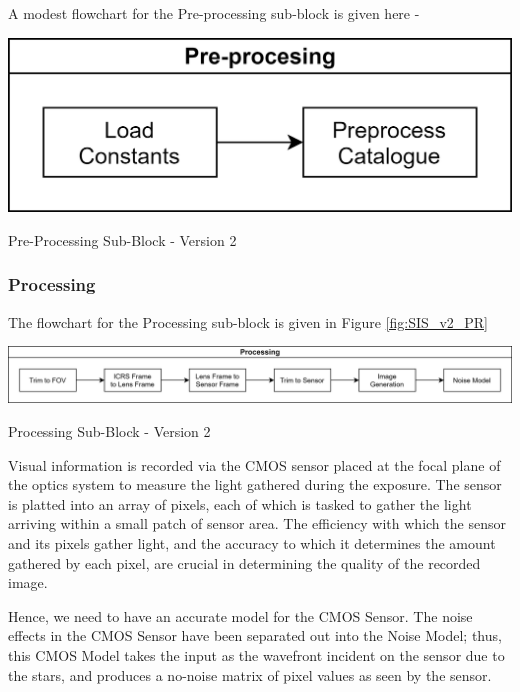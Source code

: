 A modest flowchart for the Pre-processing sub-block is given here -

\begin{Flowchart}[h!]
    \centering
    \includegraphics[scale=0.09]{Figures/Model/Pre-processing.png}
    \caption{Pre-Processing Sub-Block - Version 2}
    \label{fig:SIS_v2_PP}
\end{Flowchart}


\subsubsection{Processing}

The flowchart for the Processing sub-block is given in Figure \ref{fig:SIS_v2_PR}

\begin{Flowchart}[h!]
    \centering
    \includegraphics[scale=0.09]{Figures/Model/Processing.png}
    \caption{Processing Sub-Block - Version 2}
    \label{fig:SIS_v2_PR}
\end{Flowchart}

Visual information is recorded via the CMOS sensor placed at the focal plane of the optics system to measure the light gathered during the exposure. The sensor is platted into an array of pixels, each of which is tasked to gather the light arriving within a small patch of sensor area. The efficiency with which the sensor and its pixels gather light, and the accuracy to which it determines the amount gathered by each pixel, are crucial in determining the quality of the recorded image. \cite{DSLRs} 

Hence, we need to have an accurate model for the CMOS Sensor. The noise effects in the CMOS Sensor have been separated out into the Noise Model; thus, this CMOS Model takes the input as the wavefront incident on the sensor due to the stars, and produces a no-noise matrix of pixel values as seen by the sensor. 

